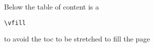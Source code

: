 \documentclass[11pt,twoside,a4paper]{article}
\begin{document}


\vfill \pagebreak

\tableofcontents
\vfill
Below the table of content is a \begin{verbatim}\vfill\end{verbatim} to avoid the toc to be stretched to fill the page
\vfill
\vfill
\vfill \pagebreak

\vfill \pagebreak

\vfill \pagebreak

\vfill \pagebreak

\vfill \pagebreak

\vfill \pagebreak
\appendix
\listoftables
\listoffigures
\printindex
\end{document}
